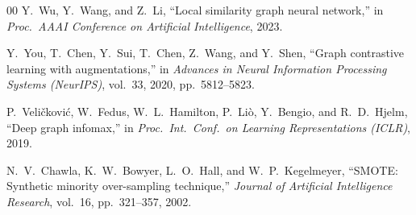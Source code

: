 \documentclass[conference]{IEEEtran}
\begin{document}
\begin{thebibliography}{00}
Y.~Wu, Y.~Wang, and Z.~Li, ``Local similarity graph neural network,'' in \textit{Proc.\ AAAI Conference on Artificial Intelligence}, 2023.

Y.~You, T.~Chen, Y.~Sui, T.~Chen, Z.~Wang, and Y.~Shen, ``Graph contrastive learning with augmentations,'' in \textit{Advances in Neural Information Processing Systems (NeurIPS)}, vol.~33, 2020, pp.~5812--5823.

P.~Veli\v{c}kovi\'{c}, W.~Fedus, W.~L.~Hamilton, P.~Li\`{o}, Y.~Bengio, and R.~D.~Hjelm, ``Deep graph infomax,'' in \textit{Proc.\ Int.\ Conf.\ on Learning Representations (ICLR)}, 2019.

N.~V.~Chawla, K.~W.~Bowyer, L.~O.~Hall, and W.~P.~Kegelmeyer, ``SMOTE: Synthetic minority over-sampling technique,'' \textit{Journal of Artificial Intelligence Research}, vol.~16, pp.~321--357, 2002.

\end{thebibliography}
\end{document}
